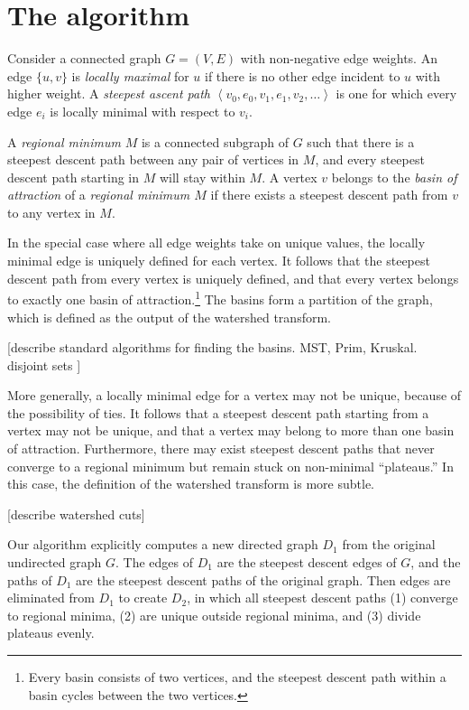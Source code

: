 \documentclass{article}\usepackage{times}
\begin{document}
\section{The algorithm}

Consider a connected graph $G=(V,E)$ with non-negative edge
weights. An edge $\{u,v\}$ is \emph{locally maximal} for
$u$ if there is no other edge incident to $u$ with higher weight.  A
\emph{steepest ascent path} $\left\langle
v_{0},e_{0},v_{1},e_{1},v_{2}, \dots \right\rangle$ is one
for which every edge $e_{i}$ is locally minimal with respect to
$v_{i}.$

A \emph{regional minimum} $M$ is a connected subgraph of $G$ such that
there is a steepest descent path between any pair of vertices in $M$,
and every steepest descent path starting in $M$ will
stay within $M$. A vertex $v$ belongs to the \emph{basin of
  attraction} of a \emph{regional minimum $M$} if there exists a
steepest descent path from $v$ to any vertex in $M$.

In the special case where all edge weights take on unique values, the
locally minimal edge is uniquely defined for each vertex.  It follows
that the steepest descent path from every vertex is uniquely defined,
and that every vertex belongs to exactly one basin of
attraction.\footnote{Every basin consists of two vertices, and the
  steepest descent path within a basin cycles between the two
  vertices.}  The basins form a partition of the graph, which is
defined as the output of the watershed transform.

[describe standard algorithms for finding the basins.  MST, Prim, Kruskal. disjoint sets ]

More generally, a locally minimal edge for a vertex may not be unique,
because of the possibility of ties.  It follows that a steepest
descent path starting from a vertex may not be unique, and that a
vertex may belong to more than one basin of attraction.  Furthermore,
there may exist steepest descent paths that never converge to a
regional minimum but remain stuck on non-minimal ``plateaus.''  In
this case, the definition of the watershed transform is more subtle.

[describe watershed cuts]

Our algorithm explicitly computes a new directed graph $D_1$ from the
original undirected graph $G$.  The edges of $D_1$ are the steepest
descent edges of $G$, and the paths of $D_1$ are the steepest descent
paths of the original graph.  Then edges are eliminated from $D_1$ to
create $D_2$, in which all steepest descent paths (1) converge to
regional minima, (2) are unique outside regional minima, and (3)
divide plateaus evenly.
\end{document}
